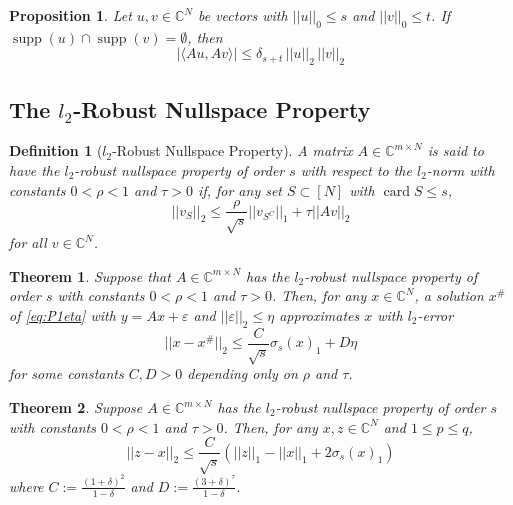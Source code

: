 \documentclass[10pt,a4paper]{article}
\theoremstyle{thmstyle}
\newtheorem{definition}{Definition}
\newtheorem{theorem}{Theorem}
\newtheorem{proposition}{Proposition}
\DeclareMathOperator{\supp}{supp}
\DeclareMathOperator{\card}{card}
\begin{document}
\begin{proposition}
  Let $u, v \in \mathbb{C}^{N}$ be vectors with $||u||_{0} \le s$ and $||v||_{0} \le t$.
  If $\supp(u) \cap \supp(v) = \emptyset$, then
  \begin{equation*}
    |\langle Au, Av \rangle| \le \delta_{s+t}\,||u||_{2}\,||v||_{2}
  \end{equation*}
\end{proposition}

\subsection{The $l_{2}$-Robust Nullspace Property}

\begin{definition}[$l_{2}$-Robust Nullspace Property]
  A matrix $A \in \mathbb{C}^{m \times N}$ is said to have the $l_{2}$-robust nullspace property of order $s$ with respect to the $l_{2}$-norm with constants $0 < \rho < 1$ and $\tau > 0$ if, for any set $S \subset [N]$ with $\card S \le s$,
  \begin{equation*}
    ||v_{S}||_{2} \le \frac{\rho}{\sqrt{s}} ||v_{S^{C}}||_{1} + \tau ||Av||_{2}
  \end{equation*}
  for all $v \in \mathbb{C}^{N}$.
\end{definition}

\begin{theorem}
  Suppose that $A \in \mathbb{C}^{m \times N}$ has the $l_{2}$-robust nullspace property of order $s$ with constants $0 < \rho < 1$ and $\tau > 0$.
  Then, for any $x \in \mathbb{C}^{N}$, a solution $x^{\#}$ of \eqref{eq:P1eta} with $y = Ax + \varepsilon$ and $||\varepsilon||_{2} \le \eta$ approximates $x$ with $l_{2}$-error
  \begin{equation*}
    ||x - x^{\#}||_{2} \le \frac{C}{\sqrt{s}} \sigma_{s}(x)_{1} + D\eta
  \end{equation*}
  for some constants $C, D > 0$ depending only on $\rho$ and $\tau$.
\end{theorem}

\begin{theorem}
  Suppose $A \in \mathbb{C}^{m \times N}$ has the $l_{2}$-robust nullspace property of order $s$ with constants $0 < \rho < 1$ and $\tau > 0$.
  Then, for any $x, z \in \mathbb{C}^{N}$ and $1 \le p \le q$,
  \begin{equation*}
    ||z - x||_{2} \le \frac{C}{\sqrt{s}} (||z||_{1} - ||x||_{1} + 2 \sigma_{s}(x)_{1})
  \end{equation*}
  where $C := \frac{(1 + \delta)^{2}}{1 - \delta}$ and $D := \frac{(3 + \delta)^{\tau}}{1 - \delta}$.
\end{theorem}
\end{document}
